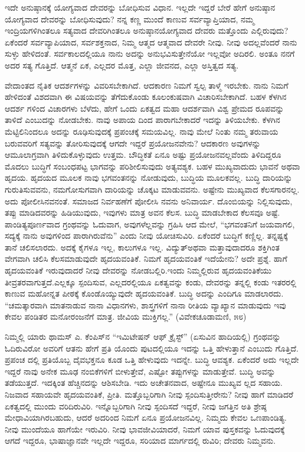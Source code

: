ಇದೇ ಅನುಷ್ಠಾನಕ್ಕೆ ಯೋಗ್ಯವಾದ ದೇವರನ್ನು ಬೋಧಿಸುವ ವಿಧಾನ. ಇಲ್ಲದೇ ಇದ್ದರೆ ಬೇರೆ ಹೇಗೆ ಅನುಷ್ಠಾನ ಯೋಗ್ಯವಾದ ದೇವರನ್ನು ಬೋಧಿಸುವುದು? ನನ್ನ ಕಣ್ಣ ಮುಂದೆ ಕಾಣುವ ಸರ್ವವ್ಯಾಪ್ತಿಯಾದ, ನಮ್ಮ ಇಂದ್ರಿಯಗಳಿಗಿಂತಲೂ ಸತ್ಯವಾದ ದೇವರಿಗಿಂತಲೂ ಅನುಷ್ಠಾನಯೋಗ್ಯವಾದ ದೇವರು ಮತ್ತೊಂದು ಎಲ್ಲಿರುವುದು? ಏಕೆಂದರೆ ಸರ್ವವ್ಯಾಪಿಯಾದ, ಸರ್ವಶಕ್ತನಾದ, ನಿಮ್ಮ ಆತ್ಮದ ಆತ್ಮವಾದ ದೇವರೇ ನೀವು. ನೀವು ಅದಲ್ಲವೆಂದರೆ ನಾನು ಸುಳ್ಳು ಹೇಳಿದಂತೆ. ಸರ್ವಕಾಲದಲ್ಲಿಯೂ ನಾನು ಅದನ್ನು ಅನುಭವಿಸುತ್ತೇನೆಯೋ ಇಲ್ಲವೋ ಅದಿರಲಿ. ಅಂತೂ ನನಗೆ ಅದರ ಸತ್ಯ ಗೊತ್ತಿದೆ. ಆತ್ಮನೆ ಏಕ, ಎಲ್ಲದರ ಮೊತ್ತ, ಎಲ್ಲಾ ಜೀವನದ, ಎಲ್ಲಾ ಅಸ್ತಿತ್ವದ ಸತ್ಯ.

ವೇದಾಂತದ ನೈತಿಕ ಆದರ್ಶಗಳನ್ನು ವಿವರಿಸಬೇಕಾಗಿದೆ. ಆದಕಾರಣ ನಿಮಗೆ ಸ್ವಲ್ಪ ತಾಳ್ಮೆ ಇರಬೇಕು. ನಾನು ನಿಮಗೆ ಹೇಳಿದಂತೆ ವಿಶದವಾಗಿ ಈ ವಿಷಯವನ್ನು ತೆಗೆದುಕೊಂಡು ಕೂಲಂಕುಷವಾಗಿ ವಿಚಾರಿಸಬೇಕಾಗಿದೆ. ಬಹಳ ಕೆಳಗಿನ ಆದರ್ಶ ಗಳಿಂದ ವಿಚಾರಗಳು ಬೆಳೆದು, ಹೇಗೆ ಒಂದು ಏಕತ್ವದ ಮಹಾ ಆದರ್ಶವಾಗಿ ವಿಶ್ವ ಪ್ರೇಮದ ರೂಪವನ್ನು ತಾಳಿದೆ ಎಂಬುದನ್ನು ನೋಡಬೇಕು. ನಾವು ಅಪಾಯ ದಿಂದ ಪಾರಾಗಬೇಕಾದರೆ ಇದನ್ನು ತಿಳಿಯಬೇಕು. ಕೆಳಗಿನ ಮೆಟ್ಟಿಲಿನಿಂದಲೂ ಅದನ್ನು ರೂಢಿಸುವುದಕ್ಕೆ ಪ್ರಪಂಚಕ್ಕೆ ಸಮಯವಿಲ್ಲ. ನಾವು ಮೇಲೆ ನಿಂತು ನಮ್ಮ ತರುವಾಯ ಬರುವವರಿಗೆ ಸತ್ಯವನ್ನು ತೋರಿಸುವುದಕ್ಕೆ ಆಗದೇ ಇದ್ದರೆ ಪ್ರಯೋಜನವೇನು? ಆದಕಾರಣ ಅವುಗಳನ್ನು ಆಮೂಲಾಗ್ರವಾಗಿ ತಿಳಿದುಕೊಳ್ಳುವುದು ಉತ್ತಮ. ಬೌದ್ಧಿಕತೆ ಏನೂ ಅಷ್ಟು ಪ್ರಯೋಜನವಲ್ಲವೆಂದು ತಿಳಿದಿದ್ದರೂ ಮೊದಲು ಬುದ್ಧಿಗೆ ಸಂಬಂಧಪಟ್ಟ ಭಾಗವನ್ನು ಪರಿಶೀಲಿಸುವುದು ಅತ್ಯವಶ್ಯಕ. ಬಹಳ ಮುಖ್ಯವಾದುದು ಭಾವನೆ ಅಥವಾ ಹೃದಯ. ಹೃದಯದ ಮೂಲಕ ನಾವು ಭಗವಂತನನ್ನು ನೋಡುವುದು, ಬುದ್ಧಿಯ ಮೂಲಕವಲ್ಲ. ಬುದ್ಧಿ ದಾರಿಯನ್ನು ಗುರುತಿಸುವವನು, ನಮಗೋಸುಗವಾಗಿ ದಾರಿಯನ್ನು ಚೊಕ್ಕಟ ಮಾಡುವವನು. ಅಷ್ಟೇನು ಮುಖ್ಯವಾದ ಕೆಲಸಗಾರನಲ್ಲ. ಅದು ಪೋಲೀಸಿನವನಂತೆ. ಸಮಾಜದ ನಿರ್ವಹಣೆಗೆ ಪೋಲೀಸಿ ನವನು ಅನಿವಾರ್ಯ. ದೊಂಬಿಯನ್ನು ನಿಲ್ಲಿಸುವುದು, ತಪ್ಪು ಮಾಡಿದವರನ್ನು ಹಿಡಿಯುವುದು, ಇವುಗಳು ಮಾತ್ರ ಅವನ ಕೆಲಸ. ಬುದ್ಧಿ ಮಾಡಬೇಕಾದ ಕೆಲಸವೂ ಅಷ್ಟೆ. ಪಾಂಡಿತ್ಯಪೂರ್ಣವಾದ ಗ್ರಂಥವನ್ನು ಓದುವಾಗ, ಅವುಗಳೆಲ್ಲವನ್ನು ಗ್ರಹಿಸಿ ಆದ ಮೇಲೆ, “ಭಗವಂತನಿಗೆ ಜಯವಾಗಲಿ, ಸದ್ಯಕ್ಕೆ ನಾನು ಅವುಗಳಿಂದ ಪಾರಾಗಿರುವೆನು” ಎಂದು ನೀವು ಯೋಚಿಸುವಿರಿ. ಏಕೆಂದರೆ ಬುದ್ಧಿಗೆ ಕಣ್ಣಿಲ್ಲ. ತನ್ನಷ್ಟಕ್ಕೆ ತಾನೆ ಚಲಿಸಲಾರದು. ಅದಕ್ಕೆ ಕೈಗಳೂ ಇಲ್ಲ, ಕಾಲುಗಳೂ ಇಲ್ಲ. ವಿದ್ಯುತ್​ ಅಥವಾ ಮತ್ತಾವುದಾದರೂ ಶಕ್ತಿಗಿಂತ ವೇಗವಾಗಿ ಚಲಿಸಿ ಕೆಲಸಮಾಡುವುದೇ ಹೃದಯವಂತಿಕೆ. ನಿಮಗೆ ಹೃದಯವಂತಿಕೆ ಇದೆಯೇನು? ಅದೇ ಪ್ರಶ್ನೆ. ಹಾಗೆ ಹೃದಯವಂತಿಕೆ ಇರುವುದಾದರೆ ನೀವು ದೇವರನ್ನು ನೋಡಬಲ್ಲಿರಿ.ಇಂದು ನಿಮ್ಮಲ್ಲಿರುವ ಹೃದಯವಂತಿಕೆಯು ತೀವ್ರತರವಾಗುತ್ತದೆ.ಎಲ್ಲಕ್ಕೂ ಸ್ಪಂದಿಸುವ, ಎಲ್ಲದರಲ್ಲಿಯೂ ಏಕತ್ವವನ್ನು ಕಂಡು, ದೇವರನ್ನು ತನ್ನಲ್ಲಿ ಕಂಡು ಇತರರಲ್ಲಿ ಕಾಣುವ ಮಹೋನ್ನತ ಪೀಠಕ್ಕೆ ಕೊಂಡೊಯ್ಯುವುದೇ ಹೃದಯವಂತಿಕೆ. ಬುದ್ಧಿ ಅದನ್ನು ಎಂದಿಗೂ ಮಾಡಲಾರದು. “ಚಮತ್ಕಾರವಾಗಿ ಮಾತನಾಡುವ ನಾನಾ ವಿಧಾನಗಳು, ಶಾಸ್ತ್ರಗಳಿಗೆ ನಾನಾ ರೀತಿಯ ವ್ಯಾಖ್ಯಾನ ಮಾಡುವುದು ಇವು ಕೇವಲ ಪಂಡಿತರ ಮನೋರಂಜನೆಗೆ ಮಾತ್ರ. ಜೀವಿಯ ಮುಕ್ತಿಗಲ್ಲ.” (ವಿವೇಕಚೂಡಾಮಣಿ, ೫೮)

ನಿಮ್ಮಲ್ಲಿ ಯಾರು ಥಾಮಸ್​ ಎ. ಕೆಂಪಿಸ್​ನ “ಇಮಿಟೇಷನ್​ ಆಫ್​ ಕ್ರೈಸ್ಟ್​” (ಏಸುವಿನ ಹಾದಿಯಲ್ಲಿ) ಗ್ರಂಥವನ್ನು ಓದಿರುವಿರೋ ಅವರಿಗೆ ಆತನು ಹೇಗೆ ಪ್ರತಿ ಯೊಂದು ಪುಟದಲ್ಲಿಯೂ ಇದನ್ನು ಒತ್ತಿ ಹೇಳುತ್ತಾನೆ ಎಂಬುದು ಗೊತ್ತಿದೆ. ಪ್ರಪಂಚ ದಲ್ಲಿ ಪ್ರತಿಯೊಬ್ಬ ದೈವಭಕ್ತನೂ ಕೂಡ ಒತ್ತಿ ಹೇಳುವುದು ಇದನ್ನೇ. ಬುದ್ಧಿ ಆವಶ್ಯಕ. ಏಕೆಂದರೆ ಅದು ಇಲ್ಲದೇ ಇದ್ದರೆ ನಾವು ಅನೇಕ ಮೂಢ ನಂಬಿಕೆಗಳಿಗೆ ಬೀಳುತ್ತೇವೆ, ಎಷ್ಟೋ ತಪ್ಪುಗಳನ್ನು ಮಾಡುತ್ತೇವೆ. ಬುದ್ಧಿ ಅವನ್ನು ತಡೆಯುತ್ತದೆ. ಇದಕ್ಕಿಂತ ಹೆಚ್ಚಿನದನ್ನು ಆಶಿಸಬೇಡಿ. ಇದು ಅಚೇತನವಾದ, ಅಷ್ಟೇನೂ ಮುಖ್ಯವ ಲ್ಲದ ಸಹಾಯ. ನಿಜವಾದ ಸಹಾಯವೇ ಹೃದಯವಂತಿಕೆ, ಪ್ರೀತಿ. ಮತ್ತೊಬ್ಬರಿಗಾಗಿ ನೀವು ಸ್ಪಂದಿಸುತ್ತೀರೇನು? ನೀವು ಹಾಗೆ ಮಾಡಿದರೆ ಏಕತ್ವದಲ್ಲಿ ಮುಂದು ವರಿದಿರುವಿರಿ. ಇನ್ನೊಬ್ಬರಿಗಾಗಿ ನೀವು ಸ್ಪಂದಿಸದೆ ಇದ್ದರೆ, ನೀವು ಜಗತ್ತಿನ ಅತಿ ಶ್ರೇಷ್ಠ ಮೇಧಾವಿಯಾಗಿರಬಹುದು, ಆದರೆ ಅದರಿಂದ ನಿಮಗೆ ಏನೂ ಪ್ರಯೋಜನವಿಲ್ಲ. ನಿಮ್ಮದು ಕೇವಲ ಒಣಪಾಂಡಿತ್ಯ. ನೀವು ಮುಂದೆಯೂ ಹಾಗೆಯೇ ಇರುವಿರಿ. ನೀವು ಭಾವಜೀವಿಯಾದರೆ, ನಿಮಗೆ ಯಾವ ಪುಸ್ತಕವನ್ನು ಓದುವುದಕ್ಕೆ ಆಗದೆ ಇದ್ದರೂ, ಭಾಷಾಜ್ಞಾನವೇ ಇಲ್ಲದೇ ಇದ್ದರೂ, ಸರಿಯಾದ ಮಾರ್ಗದಲ್ಲಿ ರುವಿರಿ; ದೇವರು ನಿಮ್ಮವನು.

